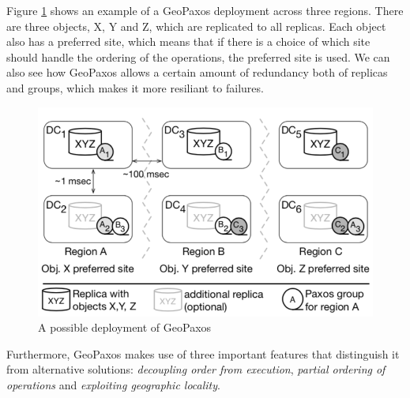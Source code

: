 Figure \ref{fig:datacenters} shows an example of a GeoPaxos deployment across three regions. There are three objects, X, Y and Z, which are replicated to all replicas. Each object also has a preferred site, which means that if there is a choice of which site should handle the ordering of the operations, the preferred site is used. We can also see how GeoPaxos allows a certain amount of redundancy both of replicas and groups, which makes it more resiliant to failures.

\begin{figure}[htb]
  \centering
  \includegraphics[width=\textwidth,height=\textheight,keepaspectratio]{img/datacenters.png}

  \caption{A possible deployment of GeoPaxos} 
  \label{fig:datacenters}
\end{figure}

Furthermore, GeoPaxos makes use of three important features that distinguish it from alternative solutions: \emph{decoupling order from execution}, \emph{partial ordering of operations} and \emph{exploiting geographic locality}. 

